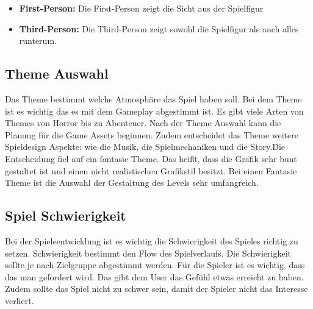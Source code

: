 \begin{itemize}
    \item \textbf{First-Person:}
    \noindent Die First-Person zeigt die Sicht aus der Spielfigur
    \item \textbf{Third-Person:}
    \noindent Die Third-Person zeigt sowohl die Spielfigur als auch alles runterum. 
\end{itemize}

\subsection{Theme Auswahl}
Das Theme bestimmt welche Atmosphäre das Spiel haben soll. Bei dem Theme ist es wichtig das es mit dem Gameplay abgestimmt ist. Es gibt viele Arten von Themes von Horror bis zu Abenteuer. Nach der Theme Auswahl kann die Planung für die Game Assets beginnen. Zudem entscheidet das Theme weitere Spieldesign Aspekte: wie die Musik, die Spielmechaniken und die  Story.Die Entscheidung fiel auf ein fantasie Theme. Das heißt, dass die Grafik sehr bunt gestaltet ist und einen nicht realistischen Grafikstil besitzt. Bei einen Fantasie Theme ist die Auswahl der Gestaltung des Levels sehr umfangreich. 


\subsection{Spiel Schwierigkeit}

Bei der Spieleentwicklung ist es wichtig die Schwierigkeit des Spieles richtig zu setzen. Schwierigkeit bestimmt den Flow des Spielverlaufs. Die Schwierigkeit sollte je nach Zielgruppe abgestimmt werden. Für die Spieler ist es wichtig, dass das man gefordert wird. Das gibt dem User das Gefühl etwas erreicht zu haben. Zudem sollte das Spiel nicht zu schwer sein, damit der Spieler nicht das Interesse verliert.

